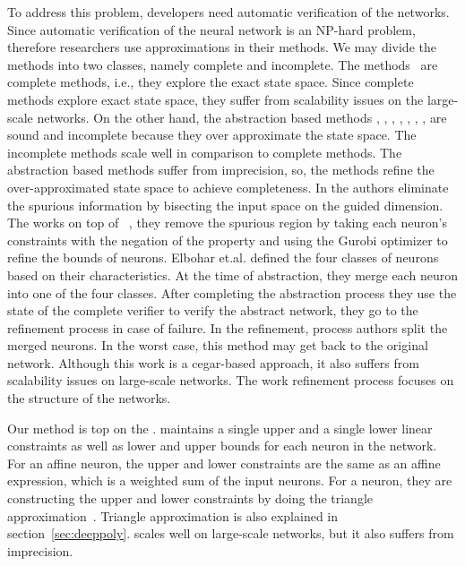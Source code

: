 To address this problem, developers need automatic verification of the networks.
Since automatic verification of the neural network is an NP-hard problem, therefore researchers use approximations in their methods. We may divide the methods into two classes, namely complete and incomplete. The methods~\cite{lomuscio2017approach,fischetti2018deep,dutta2018output,cheng2017maximum,katz2017reluplex,katz2019marabou,ehlers2017formal,huang2017safety,wang2021beta,xu2020fast,zhang2022general} are complete methods, i.e., they explore the exact state space.
Since complete methods explore exact state space, they suffer from scalability issues on the large-scale networks. On the other hand, the abstraction based methods \cite{dvijotham2018dual}, \cite{gehr2018ai2}, \cite{singh2018fast},
 \cite{singh2018boosting}, \cite{weng2018towards}, \cite{wong2018provable}, \cite{zhang2018efficient}, \cite{zhang2018efficient} are sound and incomplete because they over approximate the state space. The incomplete methods scale well in comparison to complete methods.  The abstraction based methods suffer from imprecision, so, the methods \cite{wang2018formal,wang2018efficient,elboher2020abstraction,yang2021improving,lin2020art} refine the over-approximated state space to achieve completeness. In \cite{wang2018formal,wang2018efficient,lin2020art} the authors eliminate the spurious information by bisecting the input space on the guided dimension. The \cite{yang2021improving} works on top of \deeppoly{}~\cite{singh2019abstract}, they remove
the spurious region by taking each neuron's constraints with the negation of the property and using the  Gurobi optimizer \cite{gurobioptimizer} to refine the bounds of neurons. Elbohar et.al. \cite{elboher2020abstraction} defined the four classes of neurons based on their characteristics. At the time of abstraction, they merge each neuron into one of the four classes.  After completing the abstraction process they use the state of the complete verifier to verify  the abstract network, they go to the refinement process in case of failure.   In the refinement, process authors split the merged neurons.  In the worst case, this method may get back to the original network.  Although this work is a cegar-based approach, it also suffers from scalability issues on large-scale networks.   The work \cite{elboher2020abstraction} refinement process focuses on the structure of the networks.

Our method is top on the \deeppoly{}.  \deeppoly{} maintains a single upper and a single lower linear constraints as well as lower and upper bounds
for each neuron in the network. For an affine neuron, the upper and lower constraints are the same as an affine expression, 
which is a weighted sum of the input neurons. For a \relu{} neuron, they are constructing the upper and lower constraints
by doing the triangle approximation~\cite{singh2019abstract}. 
Triangle approximation is also explained in section~\ref{sec:deeppoly}. 
\deeppoly{} scales well on large-scale networks, but it also suffers from imprecision. 

